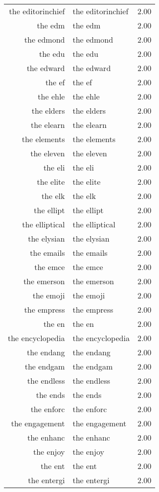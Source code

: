 \begin{table}[ht]
\begin{tabular}{rlr}
  the editorinchief & the editorinchief & 2.00 \\ 
  the edm & the edm & 2.00 \\ 
  the edmond & the edmond & 2.00 \\ 
  the edu & the edu & 2.00 \\ 
  the edward & the edward & 2.00 \\ 
  the ef & the ef & 2.00 \\ 
  the ehle & the ehle & 2.00 \\ 
  the elders & the elders & 2.00 \\ 
  the elearn & the elearn & 2.00 \\ 
  the elements & the elements & 2.00 \\ 
  the eleven & the eleven & 2.00 \\ 
  the eli & the eli & 2.00 \\ 
  the elite & the elite & 2.00 \\ 
  the elk & the elk & 2.00 \\ 
  the ellipt & the ellipt & 2.00 \\ 
  the elliptical & the elliptical & 2.00 \\ 
  the elysian & the elysian & 2.00 \\ 
  the emails & the emails & 2.00 \\ 
  the emce & the emce & 2.00 \\ 
  the emerson & the emerson & 2.00 \\ 
  the emoji & the emoji & 2.00 \\ 
  the empress & the empress & 2.00 \\ 
  the en & the en & 2.00 \\ 
  the encyclopedia & the encyclopedia & 2.00 \\ 
  the endang & the endang & 2.00 \\ 
  the endgam & the endgam & 2.00 \\ 
  the endless & the endless & 2.00 \\ 
  the ends & the ends & 2.00 \\ 
  the enforc & the enforc & 2.00 \\ 
  the engagement & the engagement & 2.00 \\ 
  the enhanc & the enhanc & 2.00 \\ 
  the enjoy & the enjoy & 2.00 \\ 
  the ent & the ent & 2.00 \\ 
  the entergi & the entergi & 2.00 \\ 

\end{tabular}
\end{table}
